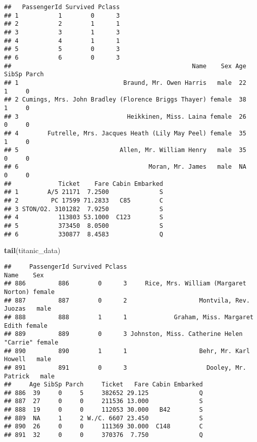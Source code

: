 \documentclass[
]{article}
\newenvironment{Shaded}{\begin{snugshade}}{\end{snugshade}}
\newcommand{\KeywordTok}[1]{\textcolor[rgb]{0.13,0.29,0.53}{\textbf{#1}}}
\newcommand{\NormalTok}[1]{#1}
\begin{document}
\begin{verbatim}
##   PassengerId Survived Pclass
## 1           1        0      3
## 2           2        1      1
## 3           3        1      3
## 4           4        1      1
## 5           5        0      3
## 6           6        0      3
##                                                  Name    Sex Age SibSp Parch
## 1                             Braund, Mr. Owen Harris   male  22     1     0
## 2 Cumings, Mrs. John Bradley (Florence Briggs Thayer) female  38     1     0
## 3                              Heikkinen, Miss. Laina female  26     0     0
## 4        Futrelle, Mrs. Jacques Heath (Lily May Peel) female  35     1     0
## 5                            Allen, Mr. William Henry   male  35     0     0
## 6                                    Moran, Mr. James   male  NA     0     0
##             Ticket    Fare Cabin Embarked
## 1        A/5 21171  7.2500              S
## 2         PC 17599 71.2833   C85        C
## 3 STON/O2. 3101282  7.9250              S
## 4           113803 53.1000  C123        S
## 5           373450  8.0500              S
## 6           330877  8.4583              Q
\end{verbatim}

\begin{Shaded}
\begin{Highlighting}[]
\KeywordTok{tail}\NormalTok{(titanic_data)}
\end{Highlighting}
\end{Shaded}

\begin{verbatim}
##     PassengerId Survived Pclass                                     Name    Sex
## 886         886        0      3     Rice, Mrs. William (Margaret Norton) female
## 887         887        0      2                    Montvila, Rev. Juozas   male
## 888         888        1      1             Graham, Miss. Margaret Edith female
## 889         889        0      3 Johnston, Miss. Catherine Helen "Carrie" female
## 890         890        1      1                    Behr, Mr. Karl Howell   male
## 891         891        0      3                      Dooley, Mr. Patrick   male
##     Age SibSp Parch     Ticket   Fare Cabin Embarked
## 886  39     0     5     382652 29.125              Q
## 887  27     0     0     211536 13.000              S
## 888  19     0     0     112053 30.000   B42        S
## 889  NA     1     2 W./C. 6607 23.450              S
## 890  26     0     0     111369 30.000  C148        C
## 891  32     0     0     370376  7.750              Q
\end{verbatim}
\end{document}
